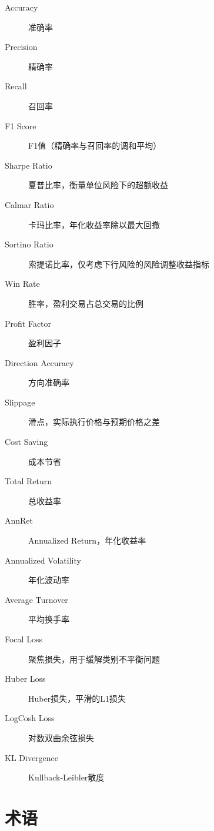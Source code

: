 \begin{description}

\item[Accuracy] 准确率
\item[Precision] 精确率
\item[Recall] 召回率
\item[F1 Score] F1值（精确率与召回率的调和平均）
\item[Sharpe Ratio] 夏普比率，衡量单位风险下的超额收益
\item[Calmar Ratio] 卡玛比率，年化收益率除以最大回撤
\item[Sortino Ratio] 索提诺比率，仅考虑下行风险的风险调整收益指标
\item[Win Rate] 胜率，盈利交易占总交易的比例
\item[Profit Factor] 盈利因子
\item[Direction Accuracy] 方向准确率
\item[Slippage] 滑点，实际执行价格与预期价格之差
\item[Cost Saving] 成本节省
\item[Total Return] 总收益率
\item[AnnRet] Annualized Return，年化收益率
\item[Annualized Volatility] 年化波动率
\item[Average Turnover] 平均换手率
\item[Focal Loss] 聚焦损失，用于缓解类别不平衡问题
\item[Huber Loss] Huber损失，平滑的L1损失
\item[LogCosh Loss] 对数双曲余弦损失
\item[KL Divergence] Kullback-Leibler散度

\end{description}

\section*{术语}

